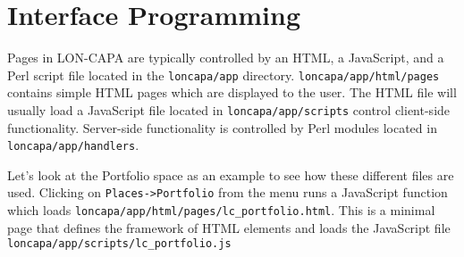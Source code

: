 \chapter{Interface Programming}

Pages in LON-CAPA are typically controlled by an HTML, a JavaScript, and a Perl script file located in the {\tt loncapa/app} directory.  {\tt loncapa/app/html/pages} contains simple HTML pages which are displayed to the user.  The HTML file will usually load a JavaScript file located in {\tt loncapa/app/scripts} control client-side functionality.  Server-side functionality is controlled by Perl modules located in {\tt loncapa/app/handlers}.

Let's look at the Portfolio space as an example to see how these different files are used.  Clicking on {\tt Places->Portfolio} from the menu runs a JavaScript function which loads {\tt loncapa/app/html/pages/lc\_portfolio.html}.  This is a minimal page that defines the framework of HTML elements and loads the JavaScript file {\tt loncapa/app/scripts/lc\_portfolio.js}